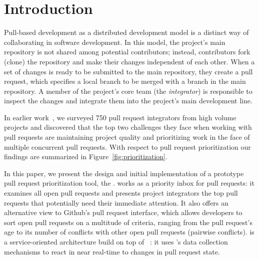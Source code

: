 \documentclass[conference]{IEEEtran}
\begin{document}



\section{Introduction}

Pull-based development as a distributed development model is a distinct way of
collaborating in software development. In this model, the project's main
repository is not shared among potential contributors; instead, contributors
fork (clone) the repository and make their changes independent of each other.
When a set of changes is ready to be submitted to the main repository, they
create a pull request, which specifies a local branch to be merged with a branch
in the main repository. A member of the project's core team (the
\emph{integrator}) is responsible to inspect the changes and integrate them into
the project's main development line.

In earlier work~\cite{GZSD15}, we surveyed 750 pull request integrators from high
volume projects and discovered that the top two challenges they face when
working with pull requests are maintaining project quality and prioritizing work
in the face of multiple concurrent pull requests. With respect to pull request
prioritization our findings are summarized in Figure~\ref{fig:prioritization}.

In this paper, we present the design and initial implementation of a prototype
pull request prioritization tool, the \prioritizer. \prioritizer works as a
priority inbox for pull requests: it examines all open pull requests and
presents project integrators the top pull requests that potentially need their immediate
attention. It also offers an alternative view to Github's pull request
interface, which allows developers to sort open pull requests on a multitude of
criteria, ranging from the pull request's age to its number of conflicts with
other open pull requests (pairwise conflicts). \prioritizer is a service-oriented architecture build on top of
\ghtorrent~\cite{G13}: it uses \ghtorrent's data collection mechanisms to react in near real-time to changes in pull request state.
\end{document}
